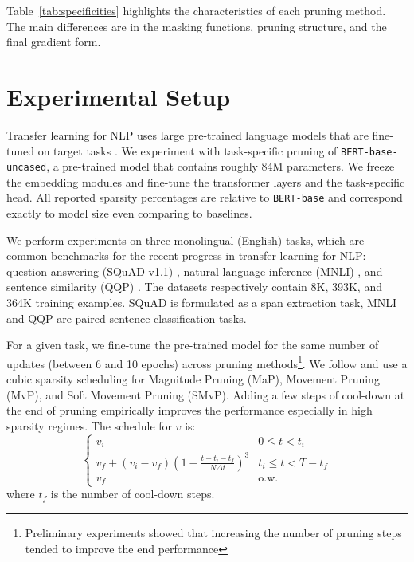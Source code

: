 \documentclass{article}
\begin{document}
Table~\ref{tab:specificities} highlights the characteristics of each pruning method.
The main differences are in the masking functions, pruning structure, and the final gradient form.



\section{Experimental Setup}

Transfer learning for NLP uses large pre-trained language models that are fine-tuned on target tasks \citep{ruder-etal-2019-transfer, devlin-etal-2019-bert, radford2019language, liu2019roberta}.
We experiment with task-specific pruning of \texttt{BERT-base-uncased}, a pre-trained model that contains roughly 84M parameters. We freeze the embedding modules and fine-tune the transformer layers and the task-specific head. All reported sparsity percentages are relative to \texttt{BERT-base} and correspond exactly to model size even comparing to baselines.

We perform experiments on three monolingual (English) tasks, which are common benchmarks for the recent progress in transfer learning for NLP: question answering (SQuAD v1.1) \citep{Rajpurkar2016SQuAD10}, natural language inference (MNLI) \citep{N18-1101}, and sentence similarity  (QQP) \citep{WinNT}. The datasets respectively contain 8K, 393K, and 364K training examples. SQuAD is formulated as a span extraction task, MNLI and QQP are paired sentence classification tasks.


For a given task, we fine-tune the pre-trained model for the same number of updates (between 6 and 10 epochs) across pruning methods\footnote{Preliminary experiments showed that increasing the number of pruning steps tended to improve the end performance}. We follow \citet{Zhu2018ToPO} and use a cubic sparsity scheduling for Magnitude Pruning (MaP), Movement Pruning (MvP), and Soft Movement Pruning (SMvP). Adding a few steps of cool-down at the end of pruning empirically improves the performance especially in high sparsity regimes. The schedule for $v$ is: 
\begin{equation}
    \label{sparsity_scheduler_cold_down}
    \begin{cases}
      v_i & 0 \leq t < t_i\\
      v_f + (v_i - v_f)(1-\frac{t-t_i-t_f}{N\Delta t})^3 &  t_i \leq t < T - t_f\\
      v_f & \text{o.w.}
    \end{cases}
\end{equation}
\noindent where $t_f$ is the number of cool-down steps.
\end{document}
